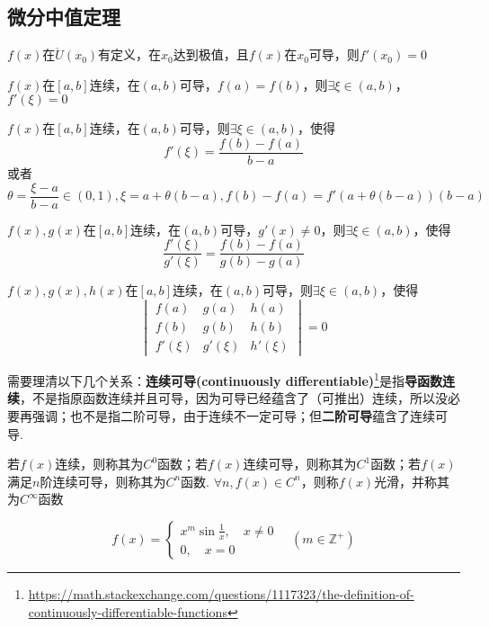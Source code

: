 \subsection{微分中值定理}
\begin{theorem}[费马(Fermart)定理]
$f(x)$在$\mathring{U}(x_0)$有定义，在$x_0$达到极值，且$f(x)$在$x_0$可导，则$f'(x_0)=0$
\end{theorem}
\begin{theorem}[罗尔(Rolle)定理]
$f(x)$在$[a,b]$连续，在$(a,b)$可导，$f(a)=f(b)$，则$\exists\xi\in(a,b)$，$f'(\xi)=0$
\end{theorem}
\begin{theorem}
$f(x)$在$[a,b]$连续，在$(a,b)$可导，则$\exists\xi\in(a,b)$，使得
\[f'(\xi)=\frac{f(b)-f(a)}{b-a}\]
或者
\[\theta=\frac{\xi-a}{b-a}\in(0,1),\xi=a+\theta(b-a),f(b)-f(a)=f'(a+\theta(b-a))(b-a)\]
\end{theorem}
\begin{theorem}
$f(x),g(x)$在$[a,b]$连续，在$(a,b)$可导，$g'(x)\ne 0$，则$\exists\xi\in(a,b)$，使得
\[\frac{f'(\xi)}{g'(\xi)}=\frac{f(b)-f(a)}{g(b)-g(a)}\]
\end{theorem}
\begin{theorem}
$f(x),g(x),h(x)$在$[a,b]$连续，在$(a,b)$可导，则$\exists\xi\in(a,b)$，使得
\begin{equation*}
\begin{vmatrix}
f(a) & g(a) & h(a)\\
f(b) & g(b) & h(b)\\
f'(\xi) & g'(\xi) & h'(\xi)
\end{vmatrix}=0
\end{equation*}
\end{theorem}
需要理清以下几个关系：\textbf{连续可导(continuously differentiable)}\footnote{\url{https://math.stackexchange.com/questions/1117323/the-definition-of-continuously-differentiable-functions}}是指\textbf{导函数连续}，不是指原函数连续并且可导，因为可导已经蕴含了（可推出）连续，所以没必要再强调；也不是指二阶可导，由于连续不一定可导；但\textbf{二阶可导}蕴含了连续可导.
\begin{definition}[光滑函数]
若$f(x)$连续，则称其为$C^0$函数；若$f(x)$连续可导，则称其为$C^1$函数；若$f(x)$满足$n$阶连续可导，则称其为$C^n$函数. $\forall n,f(x)\in C^n$，则称$f(x)$光滑，并称其为$C^\infty$函数
\end{definition}
\begin{example}
\label{egcondiff}
\[f(x)=\begin{cases}
\displaystyle x^m\sin\frac{1}{x},\quad x\ne 0\\
0,\quad x=0\end{cases}
\quad(m\in\mathbb{Z}^+)\]
\end{example}
